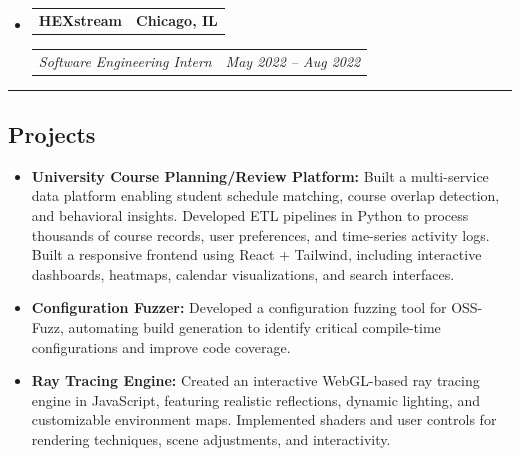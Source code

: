 \documentclass[11pt,letterpaper]{article}
\makeatletter
\newcommand{\headerrow}[2]
{\begin{tabular*}{\linewidth}{l@{\extracolsep{\fill}}r}
#1 &
#2 \\
\end{tabular*}}
\makeatother
\begin{document}
\begin{itemize}[leftmargin=1em]
	\item
	      \headerrow
	      {\textbf{HEXstream}}
	      {\textbf{Chicago, IL}}
	      \headerrow
	      {\emph{Software Engineering Intern}}
	      {\emph{May 2022 -- Aug 2022}}
\end{itemize}
\hrule
\vspace{-1em}
\subsection*{\Large Projects}
\begin{itemize}[leftmargin=1em,noitemsep]
    \item \textbf{University Course Planning/Review Platform:} Built a multi-service data platform enabling student schedule matching, course overlap detection, and behavioral insights. Developed ETL pipelines in Python to process thousands of course records, user preferences, and time-series activity logs. Built a responsive frontend using React + Tailwind, including interactive dashboards, heatmaps, calendar visualizations, and search interfaces.
    \item \textbf{Configuration Fuzzer:} Developed a configuration fuzzing tool for OSS-Fuzz, automating build generation to identify critical compile-time configurations and improve code coverage.
    \item \textbf{Ray Tracing Engine:} Created an interactive WebGL-based ray tracing engine in JavaScript, featuring realistic reflections, dynamic lighting, and customizable environment maps. Implemented shaders and user controls for rendering techniques, scene adjustments, and interactivity.
\end{itemize}
\end{document}
